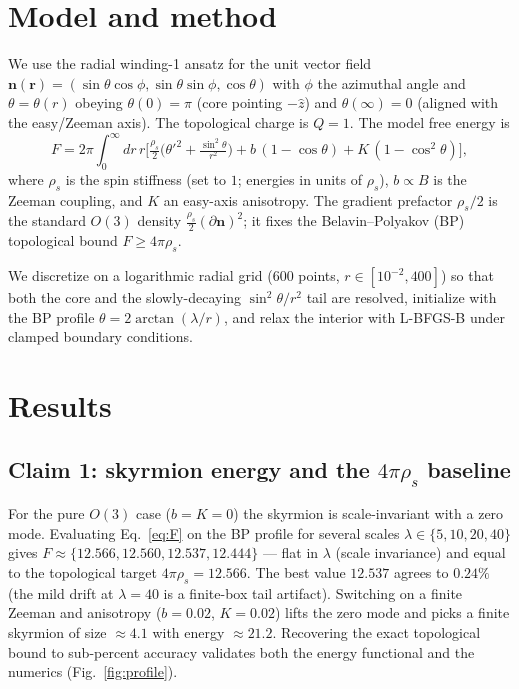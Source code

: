 \documentclass[11pt]{article}
\begin{document}
\section{Model and method}
We use the radial winding-1 ansatz for the unit vector field
$\mathbf n(\mathbf r)=(\sin\theta\cos\phi,\sin\theta\sin\phi,\cos\theta)$ with
$\phi$ the azimuthal angle and $\theta=\theta(r)$ obeying $\theta(0)=\pi$ (core
pointing $-\hat z$) and $\theta(\infty)=0$ (aligned with the easy/Zeeman axis).
The topological charge is $Q=1$. The model free energy is
\begin{equation}
F = 2\pi\!\int_0^\infty\!\! dr\, r
\Big[\tfrac{\rho_s}{2}\big(\theta'^2 + \tfrac{\sin^2\theta}{r^2}\big)
 + b\,(1-\cos\theta) + K\,(1-\cos^2\theta)\Big],
\label{eq:F}
\end{equation}
where $\rho_s$ is the spin stiffness (set to $1$; energies in units of
$\rho_s$), $b\propto B$ is the Zeeman coupling, and $K$ an easy-axis
anisotropy. The gradient prefactor $\rho_s/2$ is the standard $O(3)$ density
$\tfrac{\rho_s}{2}(\partial\mathbf n)^2$; it fixes the Belavin--Polyakov (BP)
topological bound $F\ge 4\pi\rho_s$.

We discretize on a logarithmic radial grid ($600$ points, $r\in[10^{-2},400]$)
so that both the core and the slowly-decaying $\sin^2\theta/r^2$ tail are
resolved, initialize with the BP profile $\theta=2\arctan(\lambda/r)$, and relax
the interior with L-BFGS-B under clamped boundary conditions.

\section{Results}

\subsection{Claim 1: skyrmion energy and the $4\pi\rho_s$ baseline}
For the pure $O(3)$ case ($b=K=0$) the skyrmion is scale-invariant with a zero
mode. Evaluating Eq.~\eqref{eq:F} on the BP profile for several scales
$\lambda\in\{5,10,20,40\}$ gives $F\approx\{12.566,12.560,12.537,12.444\}$ ---
flat in $\lambda$ (scale invariance) and equal to the topological target
$4\pi\rho_s=12.566$. The best value $12.537$ agrees to $\mathbf{0.24\%}$
(the mild drift at $\lambda=40$ is a finite-box tail artifact). Switching on a
finite Zeeman and anisotropy ($b=0.02$, $K=0.02$) lifts the zero mode and picks
a finite skyrmion of size $\approx4.1$ with energy $\approx21.2$. Recovering the
exact topological bound to sub-percent accuracy validates both the energy
functional and the numerics (Fig.~\ref{fig:profile}).
\end{document}
